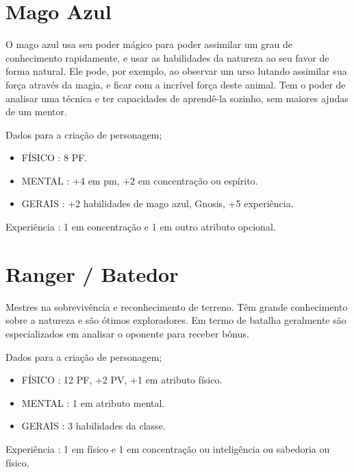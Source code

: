 \section{Mago Azul}

O mago azul usa seu poder mágico para poder assimilar um grau de conhecimento rapidamente, e usar as habilidades da natureza ao seu favor de forma natural. Ele pode, por exemplo, ao observar um urso lutando assimilar sua força através da magia, e ficar com a incrível força deste animal. Tem o poder de analisar uma técnica e ter capacidades de aprendê-la sozinho, sem maiores ajudas de um mentor.

Dados para a criação de personagem;

\begin{itemize}

	\item FÍSICO : 8 PF.

	\item MENTAL : +4 em pm, +2 em concentração ou espírito.

	\item GERAIS : +2 habilidades de mago azul, Gnosis, +5 experiência.

\end{itemize}

Experiência : 1 em concentração e 1 em outro atributo opcional.

\section{Ranger / Batedor}

Mestres na sobrevivência e reconhecimento de terreno. Têm grande conhecimento sobre a natureza e são ótimos exploradores. Em termo de batalha geralmente são especializados em analisar o oponente para receber bônus.
 

Dados para a criação de personagem;

\begin{itemize}


	\item FÍSICO : 12 PF, +2 PV, +1 em atributo físico.

	\item MENTAL : 1 em atributo mental.

	\item GERAIS : 3 habilidades da classe.

\end{itemize}

Experiência : 1 em físico e 1 em concentração ou inteligência ou sabedoria ou físico.

